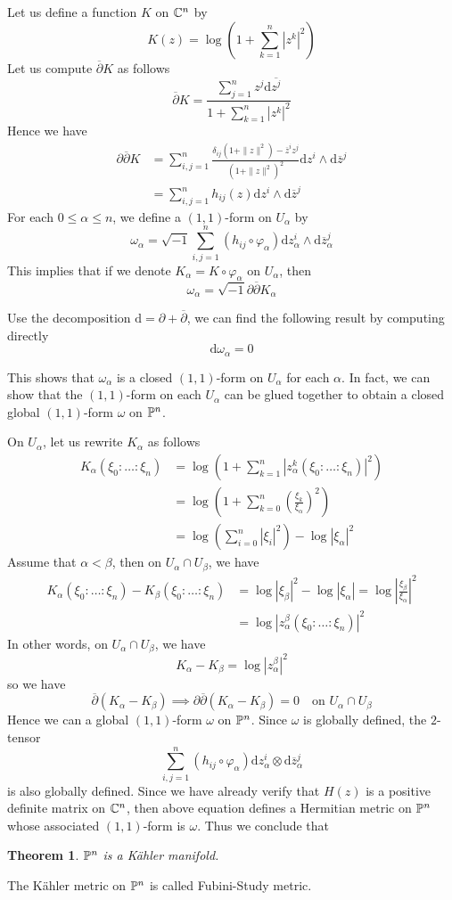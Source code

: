 \documentclass[11pt]{amsart}
\numberwithin{equation}{section}
\theoremstyle{plain}
\theoremstyle{plain}
\newtheorem{thmsub}{Theorem}[subsection]
\numberwithin{equation}{section}
\begin{document}
Let us define a function $K$ on $\Bbb{C}^n$ by
$$
K(z)=\log(1+\sum_{k=1}^n|z^k|^2)
$$
Let us compute $\overline{\partial}K$ as follows
$$
\overline{\partial}K=\frac{\sum_{j=1}^nz^j\mathrm{d}\overline{z^j}}{1+\sum_{k=1}^n|z^k|^2}
$$
Hence we have
$$
\begin{aligned}
\partial\overline{\partial}K&=\sum_{i,j=1}^n\frac{\delta_{ij}(1+\|z\|^2)-\overline{z}^iz^j}{(1+\|z\|^2)^2}\mathrm{d}z^i\wedge\mathrm{d}\overline{z}^j\\
&=\sum_{i,j=1}^nh_{ij}(z)\mathrm{d}z^i\wedge\mathrm{d}\overline{z}^j
\end{aligned}
$$
For each $0\leq\alpha\leq n$, we define a $(1,1)$-form on $U_{\alpha}$ by
$$
\omega_{\alpha}=\sqrt{-1}\sum_{i,j=1}^n(h_{ij}\circ\varphi_{\alpha})\mathrm{d}z^i_{\alpha}\wedge\mathrm{d}\overline{z}_{\alpha}^j
$$
This implies that if we denote $K_{\alpha}=K\circ\varphi_{\alpha}$ on $U_{\alpha}$, then
$$
\omega_{\alpha}=\sqrt{-1}\partial\overline{\partial}K_{\alpha}
$$

Use the decomposition $\mathrm{d}=\partial+\overline{\partial}$, we can find the following result by computing directly
$$
\mathrm{d}\omega_{\alpha}=0
$$

This shows that $\omega_{\alpha}$ is a closed $(1,1)$-form on $U_{\alpha}$ for each $\alpha$. In fact, we can show that the $(1,1)$-form on each $U_{\alpha}$ can be glued together to obtain a closed global $(1,1)$-form $\omega$ on $\Bbb{P}^n$.

On $U_{\alpha}$, let us rewrite $K_{\alpha}$ as follows
$$
\begin{aligned}
K_{\alpha}(\xi_0:\dots:\xi_n)&=\log(1+\sum_{k=1}^n|z_{\alpha}^k(\xi_0:\dots:\xi_n)|^2)\\
&=\log(1+\sum_{k=0}^n(\frac{\xi_k}{\xi_{\alpha}})^2)\\
&=\log(\sum_{i=0}^n|\xi_i|^2)-\log|\xi_{\alpha}|^2
\end{aligned}
$$
Assume that $\alpha<\beta$, then on $U_{\alpha}\cap U_{\beta}$, we have
$$
\begin{aligned}
K_{\alpha}(\xi_0:\dots:\xi_n)-K_{\beta}(\xi_0:\dots:\xi_n)&=\log|\xi_{\beta}|^2-\log|\xi_{\alpha}|=\log|\frac{\xi_{\beta}}{\xi_{\alpha}}|^2\\
&=\log|z_{\alpha}^{\beta}(\xi_0:\dots:\xi_n)|^2
\end{aligned}
$$
In other words, on $U_{\alpha}\cap U_{\beta}$, we have
$$
K_{\alpha}-K_{\beta}=\log|z_{\alpha}^{\beta}|^2
$$
so we have
$$
\overline{\partial}(K_{\alpha}-K_{\beta})\implies \partial\overline{\partial}(K_{\alpha}-K_{\beta})=0\quad \text{on }U_{\alpha}\cap U_{\beta}
$$
Hence we can a global $(1,1)$-form $\omega$ on $\Bbb{P}^n$. Since $\omega$ is globally defined, the $2$-tensor
$$
\sum_{i,j=1}^n(h_{ij}\circ\varphi_{\alpha})\mathrm{d}z_{\alpha}^i\otimes\mathrm{d}\overline{z}_{\alpha}^j
$$
is also globally defined. Since we have already verify that $H(z)$ is a positive definite matrix on $\Bbb{C}^n$, then above equation defines a Hermitian metric on $\Bbb{P}^n$ whose associated $(1,1)$-form is $\omega$. Thus we conclude that 
\begin{thmsub}
$\Bbb{P}^n$ is a Kähler manifold.
\end{thmsub}
The Kähler metric on $\Bbb{P}^n$ is called Fubini-Study metric.
\end{document}
